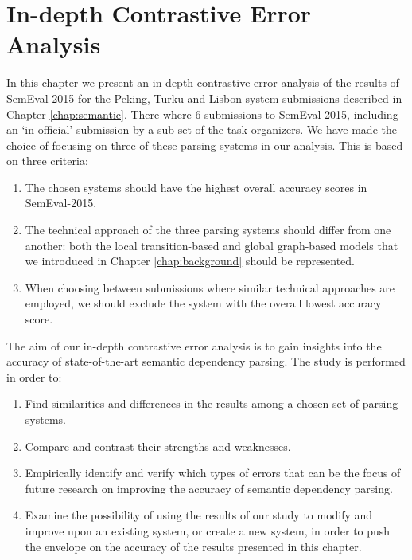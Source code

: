 \chapter{In-depth Contrastive Error Analysis}
\label{chap:analysis}



In this chapter we present an in-depth contrastive error analysis of the results of SemEval-2015 for the Peking, Turku and Lisbon system submissions described in Chapter \ref{chap:semantic}. There where 6 submissions to SemEval-2015, including an `in-official' submission by a sub-set of the task organizers. We have made the choice of focusing on three of these parsing systems in our analysis. This is based on three criteria:

\begin{enumerate}
    \item The chosen systems should have the highest overall accuracy scores in SemEval-2015.
    \item The technical approach of the three parsing systems should differ from one another: both the local transition-based and global graph-based models that we introduced in Chapter \ref{chap:background} should be represented.
    \item When choosing between submissions where similar technical approaches are employed, we should exclude the system with the overall lowest accuracy score.
\end{enumerate}

The aim of our in-depth contrastive error analysis is to gain insights into the accuracy of state-of-the-art semantic dependency parsing. The study is performed in order to:

\begin{enumerate}
    \item Find similarities and differences in the results among a chosen set of parsing systems.
    \item Compare and contrast their strengths and weaknesses.
    \item Empirically identify and verify which types of errors that can be the focus of future research on improving the accuracy of semantic dependency parsing.
    \item Examine the possibility of using the results of our study to modify and improve upon an existing system, or create a new system, in order to push the envelope on the accuracy of the results presented in this chapter.
\end{enumerate}

